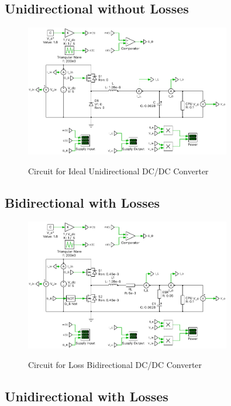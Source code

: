\documentclass{article}
\begin{document}
\subsection{Unidirectional without Losses}

\begin{figure}[H]
    \centering{}
    \includegraphics[width=0.8\textwidth]{img/ideal-unidirectional.pdf}
    \label{fig:ideal-uni-circuit}
    \caption{Circuit for Ideal Unidirectional DC/DC Converter}
\end{figure}

\subsection{Bidirectional with Losses}

\begin{figure}[H]
    \centering{}
    \includegraphics[width=0.8\textwidth]{img/loss-bidirectional.pdf}
    \label{fig:loss-bi-circuit}
    \caption{Circuit for Loss Bidirectional DC/DC Converter}
\end{figure}

\subsection{Unidirectional with Losses}
\end{document}
